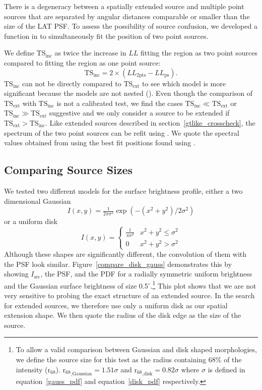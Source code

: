 \documentclass[12pt,preprint]{aastex}
\newcommand{\tsext}{{\ensuremath{\text{TS}_{\text{ext}}}}\xspace}
\newcommand{\tsinc}{\ensuremath{\text{TS}_{\text{inc}}}\xspace}
\newcommand{\loglikelihood}{\ensuremath{LL}\xspace}
\newcommand{\rsixeight}{{\ensuremath{\text{r}_{68}}}\xspace}
\renewcommand{\deg}{\ensuremath{^\circ}\xspace}
\newcommand{\pointlike}{\text{\em pointlike}\xspace}
\newcommand{\gtlike}{\text{\em gtlike}\xspace}
\begin{document}
There is a degeneracy between a spatially extended source and multiple
point sources that are separated by angular distances comparable or
smaller than the size of the LAT PSF.  To assess the possibility of source
confusion, we developed a function in \pointlike to simultaneously fit
the position of two point sources.

We define \tsinc as twice the increase in \loglikelihood fitting the
region as two point sources compared to fitting the region as one point
source: 
\begin{equation}
  \tsinc=2\times(\loglikelihood_\text{2pts}-\loglikelihood_\text{ps}).
\end{equation} 
\tsinc can not be directly compared to \tsext to see which
model is more significant because the models are not nested
(\cite{statistics_with_care}). Even though the comparison of \tsext with
\tsinc is not a calibrated test, we find the cases $\tsinc \ll \tsext$
or $\tsinc\gg\tsext$ suggestive and we only consider a source to be
extended if $\tsext>\tsinc$.
Like extended sources described in section~\ref{gtlike_crosscheck},
the spectrum of the two point sources can be refit using \gtlike.
We quote the spectral values obtained from \gtlike using the best fit
positions found using \pointlike.  

\subsection{Comparing Source Sizes}

\label{compare_source_size}

We tested two different models for the
surface brightness profile, either a two dimensional Gaussian
\begin{equation}\label{gauss_pdf}
  I(x,y)=\tfrac{1}{2\pi\sigma^2}\exp\left(-(x^2+y^2)/2\sigma^2\right)
\end{equation}
or a uniform disk
\begin{equation}\label{disk_pdf}
  I(x,y)=
  \begin{cases}
    \frac{1}{\pi\sigma^2} & x^2+y^2\le\sigma^2 \\
    0                      & x^2+y^2>\sigma^2
  \end{cases}
\end{equation}
Although these shapes are significantly different, the convolution
of them with the PSF look similar.  Figure~\ref{compare_disk_gauss}
demonstrates this by showing $I_\text{src}$, the PSF, and the PDF for
a radially symmetric uniform brightness and the Gaussian surface brightness of size 0.5\deg.\footnote{To
allow a valid comparison between Gaussian and disk shaped morphologies,
we define the source size for this test as the radius containing
68\% of the intensity ($\rsixeight$).  $\rsixeight_\text{,Gaussian}=1.51\sigma$
and $\rsixeight_\text{,disk}=0.82\sigma$ where $\sigma$
is defined in equation~\ref{gauss_pdf} and
equation~\ref{disk_pdf} respectively.} This plot shows that we are
not very sensitive to probing the exact structure of an extended source.
In the search for extended sources, we therefore use only a uniform
disk as our spatial extension shape. We then quote the radius of the
disk edge as the size of the source.
\end{document}
